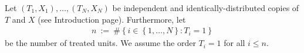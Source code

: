 Let $(T_1,X_1),\ldots,(T_N,X_N)$ be independent and identically-distributed copies of $T$ and $X$ (see Introduction page). 
Furthermore, let
\begin{gather*}
  n
  \ 
  :=
  \ 
  \# 
  \left\{ 
    i\in \left\{ 1,\ldots,N \right\}
    \colon
    T_i=1
  \right\}
\end{gather*}
be the number of treated units. We assume the order $T_i=1$ for all $i\le n$.


